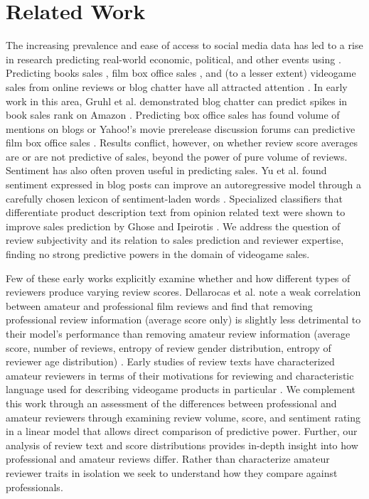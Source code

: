 \documentclass[letterpaper]{article}
\begin{document}
\section{Related Work}
The increasing prevalence and ease of access to social media data has led to a rise in research predicting real-world economic, political, and other events using \cite{asur2010predicting}. Predicting books sales \cite{gruhl2005predictive}, film box office sales \cite{dellarocas2007exploring,yu2012mining}, and (to a lesser extent) videogame sales from online reviews or blog chatter have all attracted attention \cite{ehrenfeld2011predicting,marcoux2009hybrid}. In early work in this area, Gruhl et al. demonstrated blog chatter can predict spikes in book sales rank on Amazon \cite{gruhl2005predictive}. 
Predicting box office sales has found volume of mentions on blogs or Yahoo!'s movie prerelease discussion forums can predictive film box office sales \cite{liu2001word,duan2008online}. Results conflict, however, on whether review score averages are \cite{dellarocas2007exploring} or are not \cite{liu2001word}\cite{duan2008online} predictive of sales, beyond the power of pure volume of reviews.
Sentiment has also often proven useful in predicting sales. Yu et al. found sentiment expressed in blog posts can improve an autoregressive model through a carefully chosen lexicon of sentiment-laden words \cite{yu2012mining}. Specialized classifiers that differentiate product description text from opinion related text were shown to improve sales prediction by Ghose and Ipeirotis \cite{ghose2007designing}. 
We address the question of review subjectivity and its relation to sales prediction and reviewer expertise, finding no strong predictive powers in the domain of videogame sales.

Few of these early works explicitly examine whether and how different types of reviewers produce varying review scores. Dellarocas et al. note a weak correlation between amateur and professional film reviews and find that removing professional review information (average score only) is slightly less detrimental to their model's performance than removing amateur review information (average score, number of reviews, entropy of review gender distribution, entropy of reviewer age distribution) \cite{dellarocas2007exploring}. Early studies of review texts have characterized amateur reviewers in terms of their motivations for reviewing \cite{gilbert2010deja} and characteristic language used for describing videogame products in particular \cite{zagal2011natural}. We complement this work through an assessment of the differences between professional and amateur reviewers through examining review volume, score, and sentiment rating in a linear model that allows direct comparison of predictive power. Further, our analysis of review text and score distributions provides in-depth insight into how professional and amateur reviews differ. Rather than characterize amateur reviewer traits in isolation we seek to understand how they compare against professionals.
\end{document}
